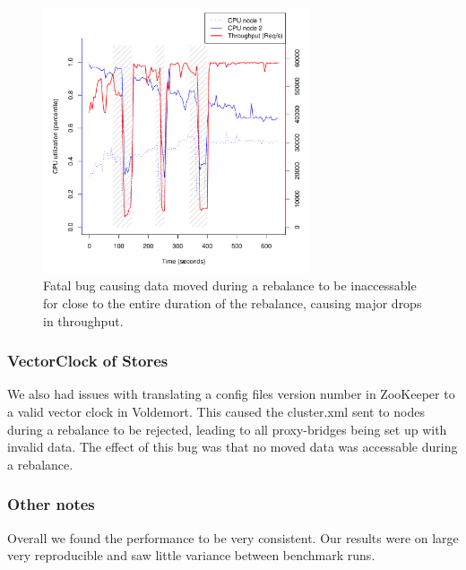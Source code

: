 \begin{figure}[h]
    \centering
    \includegraphics[width=0.7\textwidth]{results/throughput/adaptive/zookeeper/auto_2nodes_error}
    \caption{Fatal bug causing data moved during a rebalance to be inaccessable for close to the entire duration of the rebalance, causing major drops in throughput.}
    \label{fig:adaptive_bug}
\end{figure}

\subsubsection{VectorClock of Stores}
We also had issues with translating a config files version number in ZooKeeper to a valid vector clock in Voldemort. This caused the cluster.xml sent to nodes during a rebalance to be rejected, leading to all proxy-bridges being set up with invalid data. The effect of this bug was that no moved data was accessable during a rebalance. 

\subsubsection{Other notes}
Overall we found the performance to be very consistent. Our results were on large very reproducible and saw little variance between benchmark runs.
